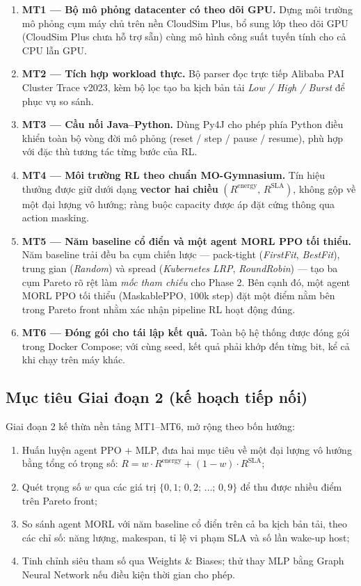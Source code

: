 \begin{enumerate}
  \item \textbf{MT1 --- Bộ mô phỏng datacenter có theo dõi GPU.}
        Dựng môi trường mô phỏng cụm máy chủ trên nền CloudSim Plus, bổ
        sung lớp theo dõi GPU (CloudSim Plus chưa hỗ trợ sẵn) cùng mô
        hình công suất tuyến tính cho cả CPU lẫn GPU.
  \item \textbf{MT2 --- Tích hợp workload thực.} Bộ parser đọc trực tiếp
        Alibaba PAI Cluster Trace v2023, kèm bộ lọc tạo ba kịch bản tải
        \emph{Low / High / Burst} để phục vụ so sánh.
  \item \textbf{MT3 --- Cầu nối Java--Python.} Dùng Py4J cho phép phía
        Python điều khiển toàn bộ vòng đời mô phỏng
        (reset / step / pause / resume), phù hợp với đặc thù tương tác
        từng bước của RL.
  \item \textbf{MT4 --- Môi trường RL theo chuẩn MO-Gymnasium.}
        Tín hiệu thưởng được giữ dưới dạng \textbf{vector hai chiều}
        $(R^{\mathrm{energy}},\, R^{\mathrm{SLA}})$, không gộp về một
        đại lượng vô hướng; ràng buộc capacity được áp đặt cứng thông
        qua action masking.
  \item \textbf{MT5 --- Năm baseline cổ điển và một agent MORL PPO tối
        thiểu.} Năm baseline trải đều ba cụm chiến lược --- pack-tight
        (\emph{FirstFit}, \emph{BestFit}), trung gian (\emph{Random}) và
        spread (\emph{Kubernetes LRP}, \emph{RoundRobin}) --- tạo ba
        cụm Pareto rõ rệt làm \emph{mốc tham chiếu} cho Phase 2. Bên
        cạnh đó, một agent MORL PPO tối thiểu (MaskablePPO, $100$k step)
        đặt một điểm nằm bên trong Pareto front nhằm xác nhận pipeline
        RL hoạt động đúng.
  \item \textbf{MT6 --- Đóng gói cho tái lập kết quả.} Toàn bộ hệ thống
        được đóng gói trong Docker Compose; với cùng seed, kết quả phải
        khớp đến từng bit, kể cả khi chạy trên máy khác.
\end{enumerate}

\subsection{Mục tiêu Giai đoạn 2 (kế hoạch tiếp nối)}
Giai đoạn 2 kế thừa nền tảng MT1--MT6, mở rộng theo bốn hướng:
\begin{enumerate}
  \item Huấn luyện agent PPO + MLP, đưa hai mục tiêu về một đại lượng
        vô hướng bằng tổng có trọng số: $R = w \cdot R^{\mathrm{energy}}
        + (1 - w) \cdot R^{\mathrm{SLA}}$;
  \item Quét trọng số $w$ qua các giá trị
        $\{0{,}1;\, 0{,}2;\, \dots;\, 0{,}9\}$ để thu được nhiều điểm
        trên Pareto front;
  \item So sánh agent MORL với năm baseline cổ điển trên cả ba kịch bản
        tải, theo các chỉ số: năng lượng, makespan, tỉ lệ vi phạm SLA
        và số lần wake-up host;
  \item Tinh chỉnh siêu tham số qua Weights \& Biases; thử thay MLP
        bằng Graph Neural Network nếu điều kiện thời gian cho phép.
\end{enumerate}

